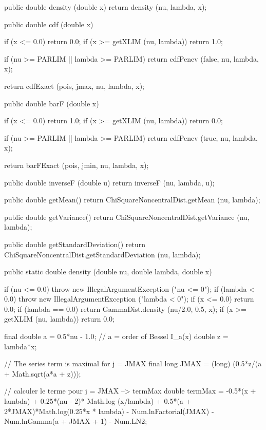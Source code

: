 \begin{code}\begin{hide}

   public double density (double x) {
      return density (nu, lambda, x);
   }

   public double cdf (double x) {
      if (x <= 0.0)
         return 0.0;
      if (x >= getXLIM (nu, lambda))
         return 1.0;

      if (nu >= PARLIM || lambda >= PARLIM)
         return cdfPenev (false, nu, lambda, x);

      return cdfExact (pois, jmax, nu, lambda, x);
   }

   public double barF (double x) {
      if (x <= 0.0)
         return 1.0;
      if (x >= getXLIM (nu, lambda))
         return 0.0;

      if (nu >= PARLIM || lambda >= PARLIM)
         return cdfPenev (true, nu, lambda, x);

      return barFExact (pois, jmin, nu, lambda, x);
   }

   public double inverseF (double u) {
      return inverseF (nu, lambda, u);
   }

   public double getMean() {
      return ChiSquareNoncentralDist.getMean (nu, lambda);
   }

   public double getVariance() {
      return ChiSquareNoncentralDist.getVariance (nu, lambda);
   }

   public double getStandardDeviation() {
      return ChiSquareNoncentralDist.getStandardDeviation (nu, lambda);
   }\end{hide}

   public static double density (double nu, double lambda, double x)\begin{hide} {
      if (nu <= 0.0)
         throw new IllegalArgumentException ("nu <= 0");
      if (lambda < 0.0)
         throw new IllegalArgumentException ("lambda < 0");
      if (x <= 0.0)
         return 0.0;
      if (lambda == 0.0)
         return GammaDist.density (nu/2.0, 0.5, x);
      if (x >= getXLIM (nu, lambda))
         return 0.0;

      final double a = 0.5*nu - 1.0;      // a = order of Bessel I_a(x)
      double z = lambda*x;

      // The series term is maximal for j = JMAX
      final long JMAX = (long) (0.5*z/(a + Math.sqrt(a*a + z)));

      // calculer le terme pour j = JMAX --> termMax
      double termMax = -0.5*(x + lambda) + 0.25*(nu - 2)* Math.log (x/lambda) +
         0.5*(a + 2*JMAX)*Math.log(0.25*x * lambda) - Num.lnFactorial(JMAX) -
         Num.lnGamma(a + JMAX + 1) - Num.LN2;

}
\end{hide}
\end{code}
